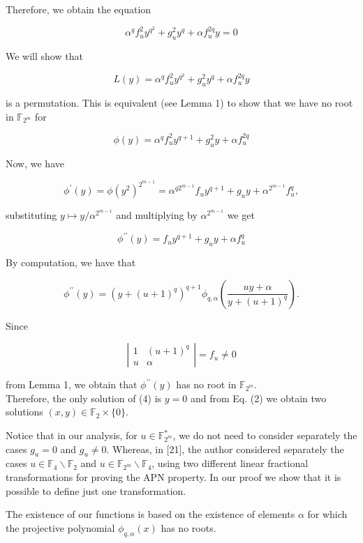 \documentclass[10pt]{article}
\begin{document}
Therefore, we obtain the equation


\begin{equation*}
\alpha^{q} f_{u}^{2} y^{q^{2}}+g_{u}^{2} y^{q}+\alpha f_{u}^{2 q} y=0 \tag{4}
\end{equation*}


We will show that

$$
L(y)=\alpha^{q} f_{u}^{2} y^{q^{2}}+g_{u}^{2} y^{q}+\alpha f_{u}^{2 q} y
$$

is a permutation. This is equivalent (see Lemma 1) to show that we have no root in $\mathbb{F}_{2^{m}}$ for

$$
\phi(y)=\alpha^{q} f_{u}^{2} y^{q+1}+g_{u}^{2} y+\alpha f_{u}^{2 q}
$$

Now, we have

$$
\phi^{\prime}(y)=\phi\left(y^{2}\right)^{2^{m-1}}=\alpha^{q 2^{m-1}} f_{u} y^{q+1}+g_{u} y+\alpha^{2^{m-1}} f_{u}^{q},
$$

substituting $y \mapsto y / \alpha^{2^{m-1}}$ and multiplying by $\alpha^{2^{m-1}}$ we get

$$
\phi^{\prime \prime}(y)=f_{u} y^{q+1}+g_{u} y+\alpha f_{u}^{q}
$$

By computation, we have that

$$
\phi^{\prime \prime}(y)=\left(y+(u+1)^{q}\right)^{q+1} \phi_{q, \alpha}\left(\frac{u y+\alpha}{y+(u+1)^{q}}\right) .
$$

Since

$$
\left|\begin{array}{cc}
1 & (u+1)^{q} \\
u & \alpha
\end{array}\right|=f_{u} \neq 0
$$

from Lemma 1, we obtain that $\phi^{\prime \prime}(y)$ has no root in $\mathbb{F}_{2^{m}}$.\\
Therefore, the only solution of (4) is $y=0$ and from Eq. (2) we obtain two solutions $(x, y) \in \mathbb{F}_{2} \times\{0\}$.

Notice that in our analysis, for $u \in \mathbb{F}_{2^{m}}^{*}$, we do not need to consider separately the cases $g_{u}=0$ and $g_{u} \neq 0$. Whereas, in [21], the author considered separately the cases $u \in \mathbb{F}_{4} \backslash \mathbb{F}_{2}$ and $u \in \mathbb{F}_{2^{m}} \backslash \mathbb{F}_{4}$, using two different linear fractional transformations for proving the APN property. In our proof we show that it is possible to define just one transformation.

The existence of our functions is based on the existence of elements $\alpha$ for which the projective polynomial $\phi_{q, \alpha}(x)$ has no roots.
\end{document}
